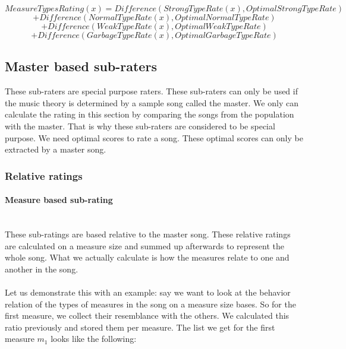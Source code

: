 \documentclass[a4paper]{article}
\begin{document}
\[MeasureTypesRating(x) = Difference( StrongTypeRate(x) , OptimalStrongTypeRate) \]
\[+ Difference( NormalTypeRate(x) , OptimalNormalTypeRate) \]
\[+ Difference( WeakTypeRate(x) , OptimalWeakTypeRate) \]
\[+ Difference( GarbageTypeRate(x) , OptimalGarbageTypeRate) \]



\subsection{Master based sub-raters} \label{sec:master_based_subrater}
These sub-raters are special purpose raters. These sub-raters can only be used if the music theory is determined by a sample song called the master. We only can calculate the rating in this section by comparing the songs from the population with the master. That is why these sub-raters are considered to be special purpose. We need optimal scores to rate a song. These optimal scores can only be extracted by a master song.
\subsubsection{Relative ratings}\label{sec:relratings}
\paragraph{Measure based sub-rating}\mbox{}\\ \label{sec:relmeasurebasedratings}
These sub-ratings are based relative to the master song. These relative ratings are calculated on a measure size and summed up afterwards to represent the whole song. What we actually calculate is how the measures relate to one and another in the song. 
\\\\
Let us demonstrate this with an example: say we want to look at the behavior relation of the types of measures in the song on a measure size bases. So for the first measure, we collect their resemblance with the others. We calculated this ratio previously and stored them per measure. The list we get for the first measure $m_1$ looks like the following:
\end{document}
